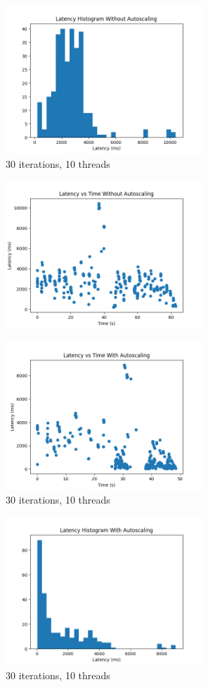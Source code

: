 \documentclass{article}
\begin{document}
\begin{figure}[H]
    \centering
    \includegraphics[width=20em]{../plots/latency_without_autoscaling_hist.png}
    \caption{30 iterations, 10 threads}
\end{figure}

\begin{figure}[H]
    \centering
    \includegraphics[width=20em]{../plots/latency_without_autoscaling.png}
\end{figure}

\begin{figure}[H]
    \centering
    \includegraphics[width=20em]{../plots/latency_with_autoscaling.png}
    \caption{30 iterations, 10 threads}
\end{figure}

\begin{figure}[H]
    \centering
    \includegraphics[width=20em]{../plots/latency_with_autoscaling_hist.png}
    \caption{30 iterations, 10 threads}
\end{figure}
\end{document}
